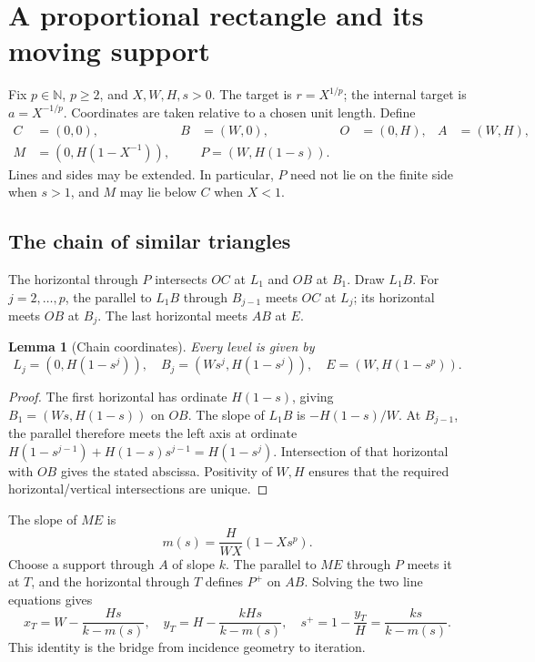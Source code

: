 \documentclass[11pt,a4paper]{article}
\newtheorem{lemma}[theorem]{Lemma}
\theoremstyle{remark}\newtheorem{remark}[theorem]{Remark}
\numberwithin{equation}{section}
\begin{document}
\section{A proportional rectangle and its moving support}\label{sec:geometry}
Fix $p\in\mathbb N$, $p\ge2$, and $X,W,H,s>0$. The target is $r=X^{1/p}$; the internal target is $a=X^{-1/p}$. Coordinates are taken relative to a chosen unit length. Define
\begin{align}
 C&=(0,0),& B&=(W,0),& O&=(0,H),& A&=(W,H),\\
 M&=(0,H(1-X^{-1})),&& P=(W,H(1-s)).\label{eq:points}
\end{align}
Lines and sides may be extended. In particular, $P$ need not lie on the finite side when $s>1$, and $M$ may lie below $C$ when $X<1$.

\subsection{The chain of similar triangles}
The horizontal through $P$ intersects $OC$ at $L_1$ and $OB$ at $B_1$. Draw $L_1B$. For $j=2,\ldots,p$, the parallel to $L_1B$ through $B_{j-1}$ meets $OC$ at $L_j$; its horizontal meets $OB$ at $B_j$. The last horizontal meets $AB$ at $E$.

\begin{lemma}[Chain coordinates]\label{lem:chain}
Every level is given by
\begin{equation}
 L_j=(0,H(1-s^j)),\quad B_j=(Ws^j,H(1-s^j)),\quad E=(W,H(1-s^p)).
\end{equation}
\end{lemma}
\begin{proof}
The first horizontal has ordinate $H(1-s)$, giving $B_1=(Ws,H(1-s))$ on $OB$. The slope of $L_1B$ is $-H(1-s)/W$. At $B_{j-1}$, the parallel therefore meets the left axis at ordinate
$H(1-s^{j-1})+H(1-s)s^{j-1}=H(1-s^j)$.
Intersection of that horizontal with $OB$ gives the stated abscissa. Positivity of $W,H$ ensures that the required horizontal/vertical intersections are unique.
\end{proof}

The slope of $ME$ is
\begin{equation}
 m(s)=\frac{H}{WX}(1-Xs^p).
\end{equation}
Choose a support through $A$ of slope $k$. The parallel to $ME$ through $P$ meets it at $T$, and the horizontal through $T$ defines $P^+$ on $AB$. Solving the two line equations gives
\begin{equation}
 x_T=W-\frac{Hs}{k-m(s)},\quad y_T=H-\frac{kHs}{k-m(s)},\quad
 s^+=1-\frac{y_T}{H}=\frac{ks}{k-m(s)}.\label{eq:report}
\end{equation}
This identity is the bridge from incidence geometry to iteration.
\end{document}
